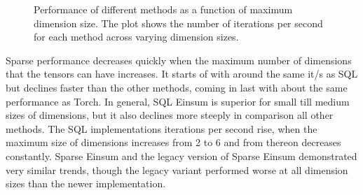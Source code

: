 \begin{figure}[H]
    \caption{Performance of different methods as a function of maximum dimension size.
        The plot shows the number of iterations per second for each method across varying dimension sizes.}
    \label{fig:exp:max_dim_size}
\end{figure}

\noindent
Sparse performance decreases quickly when the maximum number of dimensions that the tensors
can have increases. It starts of with around the same it/s as SQL but declines faster than
the other methods, coming in last with about the same performance as Torch. In general,
SQL Einsum is superior for small till medium sizes of dimensions, but it also declines more
steeply in comparison all other methods. The SQL implementations iterations per second rise,
when the maximum size of dimensions increases from 2 to 6 and from thereon decreases constantly.
Sparse Einsum and the legacy version of Sparse Einsum demonstrated very similar trends,
though the legacy variant performed worse at all dimension sizes than the newer implementation.

